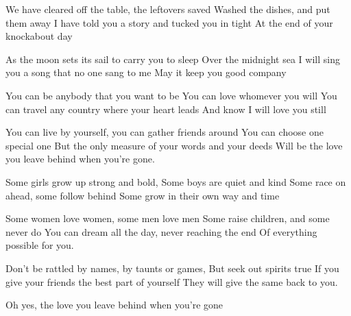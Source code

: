 

\beginverse
We have cleared off the table, the leftovers saved
Washed the dishes, and put them away
I have told you a story and tucked you in tight
At the end of your knockabout day

As the moon sets its sail to carry you to sleep
Over the midnight sea
I will sing you a song that no one sang to me
May it keep you good company
\endverse

\beginchorus
You can be anybody that you want to be
You can love whomever you will
You can travel any country where your heart leads
And know I will love you still

You can live by yourself, you can gather friends around
You can choose one special one
But the only measure of your words and your deeds
Will be the love you leave behind when you're gone.
\endchorus

\beginverse
Some girls grow up strong and bold, 
Some boys are quiet and kind
Some race on ahead, some follow behind
Some grow in their own way and time

Some women love women, some men love men
Some raise children, and some never do
You can dream all the day, never reaching the end
Of everything possible for you.

Don't be rattled by names, by taunts or games,
But seek out spirits true
If you give your friends the best part of yourself
They will give the same back to you.
\endverse

\beginverse
[CHORUS]

Oh yes, the love you leave behind when you're gone
\endverse

\endsong